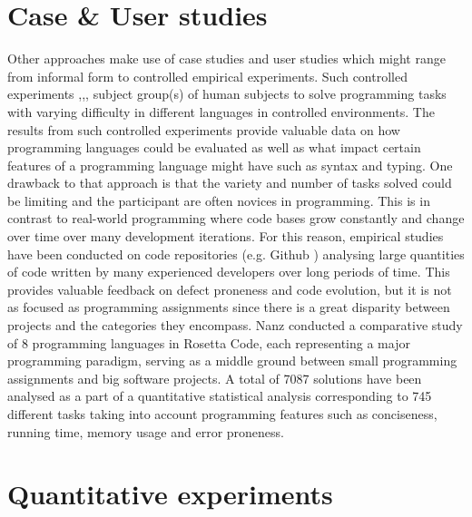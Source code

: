 \section{Case \& User studies}
Other approaches make use of case studies and user studies which might range from informal form to controlled empirical experiments. Such controlled experiments \cite{DynamicTypeSystems},\cite{MulticoreLangs},\cite{EmpiricalComparison}, \cite{Empiricalinvestigation} subject group(s) of human subjects to solve programming tasks with varying difficulty in different languages in controlled environments. The results from such controlled experiments provide valuable data on how programming languages could be evaluated as well as what impact certain features of a programming language might have such as syntax and typing. One drawback to that approach is that the variety and number of tasks solved could be limiting and the participant are often novices in programming. This is in contrast to real-world programming where code bases grow constantly and change over time over many development iterations. For this reason, empirical studies have been conducted on code repositories (e.g. Github \cite{GitHub}) analysing large quantities of code written by many experienced developers  over long periods of time. This provides valuable feedback on defect proneness and code evolution, but it is not as focused as programming assignments since there is a great disparity between projects and the categories they encompass. Nanz \cite{RosettaCode} conducted a comparative study of 8 programming languages in Rosetta Code, each representing a major programming paradigm, serving as a middle ground between small programming assignments and big software projects. A total of 7087 solutions have been analysed as a part of a quantitative statistical analysis corresponding to 745 different tasks taking into account programming features such as conciseness, running time, memory usage and error proneness.

\section{Quantitative experiments }

